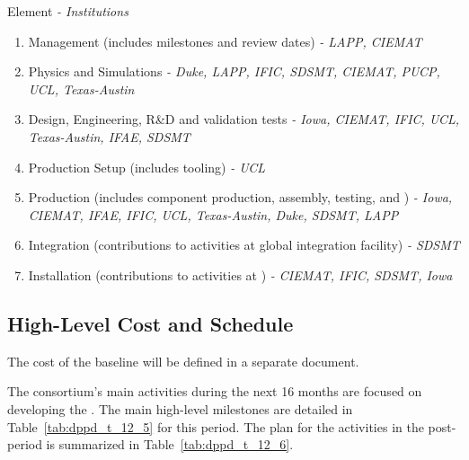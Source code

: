  Element \textit{- Institutions} \\
\begin{enumerate}
\item Management \dual {} (includes milestones and review dates) \textit{- LAPP, CIEMAT }
\item Physics and Simulations \textit{- Duke, LAPP, IFIC, SDSMT, CIEMAT, PUCP, UCL, Texas-Austin}
\item Design, Engineering, R\&D and validation tests \textit{- Iowa, CIEMAT, IFIC, UCL, Texas-Austin, IFAE, SDSMT}
\item Production Setup (includes tooling) \textit{- UCL}
\item Production (includes component production, assembly, testing, and ) \textit{- Iowa, CIEMAT, IFAE, IFIC, UCL, Texas-Austin, Duke, SDSMT, LAPP}
\item Integration (contributions to activities at global integration facility) \textit{- SDSMT}
\item Installation (contributions to activities at \surf) \textit{- CIEMAT, IFIC, SDSMT, Iowa}
\end{enumerate}


\subsection{High-Level Cost and Schedule}
\label{sec:fddp-pd-12.4}

The cost of the baseline \dual  {} will be defined in a separate document. 

The \dual {} consortium's main activities during the next \num{16} months are focused on developing the . The main high-level milestones are detailed in Table~\ref{tab:dppd_t_12_5} for this period. The plan for the activities in the post- period is summarized in Table~\ref{tab:dppd_t_12_6}.

